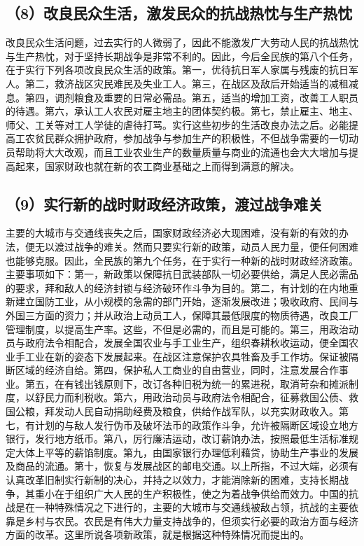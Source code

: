 \subsection{（8）改良民众生活，激发民众的抗战热忱与生产热忱}

改良民众生活问题，过去实行的人微弱了，因此不能激发广大劳动人民的抗战热忱与生产热忱，对于坚持长期战争是非常不利的。因此，今后全民族的第八个任务，在于实行下列各项改良民众生活的政策。第一，优待抗日军人家属与残废的抗日军人。第二，救济战区灾民难民及失业工人。第三，在战区及敌后开始适当的减租减息。第四，调剂粮食及重要的日常必需品。第五，适当的增加工资，改善工人职员的待遇。第六，承认工人农民对雇主地主的团体契约极。第七，禁止雇主、地主、师父、工关等对工人学徒的虐待打骂。实行这些初步的生活改良办法之后。必能提高工农贫民群众拥护政府，参加战争与参加生产的积极性，不但战争需要的一切动员帮助将大大改观，而且工业农业生产的数量质量与商业的流通也会大大增加与提高起来，国家财政也就在新的农工商业基础之上而得到满意的解决。

\subsection{（9）实行新的战时财政经济政策，渡过战争难关}

主要的大城市与交通线丧失之后，国家财政经济必大现困难，没有新的有效的办法，便无以渡过战争的难关。然而只要实行新的政策，动员人民力量，便任何困难也能够克服。因此，全民族的第九个任务，在于实行一种新的战时财政经济政策。主要事项如下：第一，新政策以保障抗日武装部队一切必要供给，满足人民必需品的要求，拜和敌人的经济封锁与经济破环作斗争为目的。第二，有计划的在内地重新建立国防工业，从小规模的急需的部门开始，逐渐发展改进；吸收政府、民间与外国三方面的资力；并从政治上动员工人，保障其最低限度的物质待遇，改良工厂管理制度，以提高生产率。这些，不但是必需的，而且是可能的。第三，用政治动员与政府法令相配合，发展全国农业与手工业生产，组织春耕秋收运动，便全国农业手工业在新的姿态下发展起来。在战区注意保护农具牲畜及手工作坊。保证被隔断区域的经济自给。第四，保护私人工商业的自由营业，同时，注意发展合作事业。第五，在有钱出钱原则下，改订各种旧税为统一的累进税，取消苛杂和摊派制度，以舒民力而利税收。第六，用政治动员与政府法令相配合，征募救国公债、救国公粮，拜发动人民自动捐助经费及粮食，供给作战军队，以充实财政收入。第七，有计划的与敌人发行伪币及破坏法币的政策作斗争，允许被隔断区域设立地方银行，发行地方纸币。第八，厉行廉洁运动，改订薪饷办法，按照最低生活标准规定大体上平等的薪馅制度。第九，由国家银行办理低利藉贷，协助生产事业的发展及商品的流通。第十，恢复与发展战区的邮电交通。以上所指，不过大端，必须有认真改革旧制实行新制的决心，并持之以效力，才能消除新的困难，支持长期战争，其重小在于组织广大人民的生产积极性，使之为着战争供给而效力。中国的抗战是在一种特殊情况之下进行的，主要的大城市与交通线被敌占领，抗战的主要依靠是乡村与农民。农民是有伟大力量支持战争的，但须实行必要的政治方面与经济方面的改革。这里所说各项新政策，就是根据这种特殊情况而提出的。

